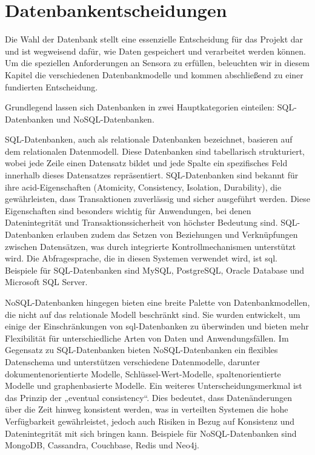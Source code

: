 
\section{Datenbankentscheidungen}
Die Wahl der Datenbank stellt eine essenzielle Entscheidung für das Projekt dar und ist wegweisend dafür, wie Daten gespeichert und verarbeitet werden können. Um die speziellen Anforderungen an Sensora zu erfüllen, beleuchten wir in diesem Kapitel die verschiedenen Datenbankmodelle und kommen abschließend zu einer fundierten Entscheidung.

Grundlegend lassen sich Datenbanken in zwei Hauptkategorien einteilen: SQL-Da\-ten\-ban\-ken und NoSQL-Datenbanken.

SQL-Datenbanken, auch als relationale Datenbanken bezeichnet, basieren auf dem relationalen Datenmodell. Diese Datenbanken sind tabellarisch strukturiert, wobei jede Zeile einen Datensatz bildet und jede Spalte ein spezifisches Feld innerhalb dieses Datensatzes repräsentiert. SQL-Datenbanken sind bekannt für ihre \acs{acid}-Eigenschaften (Atomicity, Consistency, Isolation, Durability), die gewährleisten, dass Transaktionen zuverlässig und sicher ausgeführt werden. Diese Eigenschaften sind besonders wichtig für Anwendungen, bei denen Datenintegrität und Transaktionssicherheit von höchster Bedeutung sind. SQL-Datenbanken erlauben zudem das Setzen von Beziehungen und Verknüpfungen zwischen Datensätzen, was durch integrierte Kontrollmechanismen unterstützt wird. Die Abfragesprache, die in diesen Systemen verwendet wird, ist \ac{sql}. Beispiele für SQL-Datenbanken sind MySQL, PostgreSQL, Oracle Database und Microsoft SQL Server.

NoSQL-Datenbanken hingegen bieten eine breite Palette von Datenbankmodellen, die nicht auf das relationale Modell beschränkt sind. Sie wurden entwickelt, um einige der Einschränkungen von \ac{sql}-Datenbanken zu überwinden und bieten mehr Flexibilität für unterschiedliche Arten von Daten und Anwendungsfällen. Im Gegensatz zu SQL-Datenbanken bieten NoSQL-Datenbanken ein flexibles Datenschema und unterstützen verschiedene Datenmodelle, darunter dokumentenorientierte Modelle, Schlüssel-Wert-Modelle, spaltenorientierte Modelle und graphenbasierte Modelle. Ein weiteres Unterscheidungsmerkmal ist das Prinzip der „eventual consistency“. Dies bedeutet, dass Datenänderungen über die Zeit hinweg konsistent werden, was in verteilten Systemen die hohe Verfügbarkeit gewährleistet, jedoch auch Risiken in Bezug auf Konsistenz und Datenintegrität mit sich bringen kann. Beispiele für NoSQL-Da\-ten\-ban\-ken sind MongoDB, Cassandra, Couchbase, Redis und Neo4j. \cite{Kofler2024}

